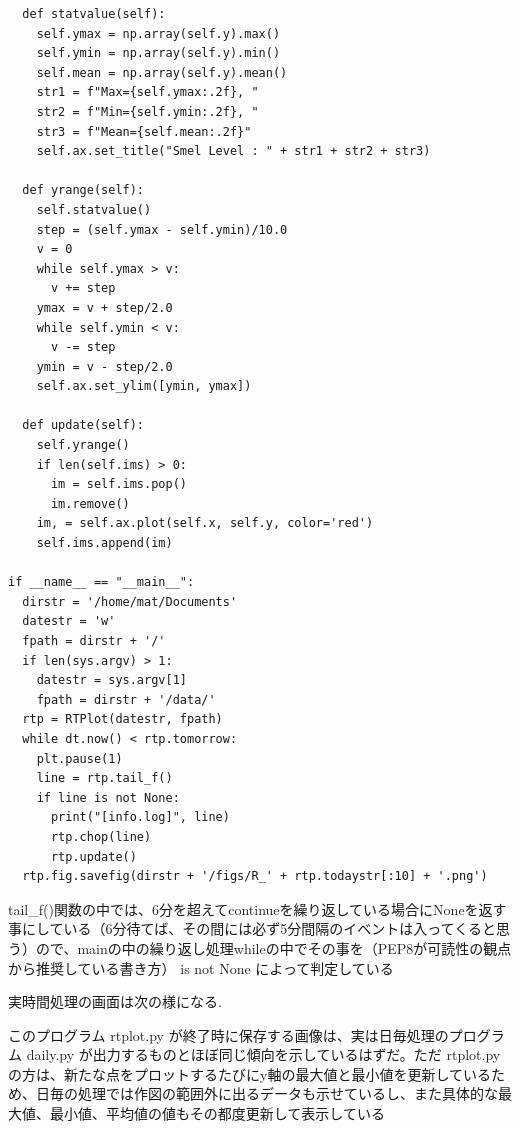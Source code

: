 \documentclass[12pt,a4j]{jsbook}
\begin{document}
\begin{spacing}{0.87}
\begin{breakbox}
\begin{verbatim}
  def statvalue(self):
    self.ymax = np.array(self.y).max()
    self.ymin = np.array(self.y).min()
    self.mean = np.array(self.y).mean()
    str1 = f"Max={self.ymax:.2f}, "
    str2 = f"Min={self.ymin:.2f}, "
    str3 = f"Mean={self.mean:.2f}"
    self.ax.set_title("Smel Level : " + str1 + str2 + str3)

  def yrange(self):
    self.statvalue()
    step = (self.ymax - self.ymin)/10.0
    v = 0
    while self.ymax > v:
      v += step
    ymax = v + step/2.0
    while self.ymin < v:
      v -= step
    ymin = v - step/2.0
    self.ax.set_ylim([ymin, ymax])

  def update(self):
    self.yrange()
    if len(self.ims) > 0:
      im = self.ims.pop()
      im.remove()
    im, = self.ax.plot(self.x, self.y, color='red')
    self.ims.append(im)

if __name__ == "__main__":
  dirstr = '/home/mat/Documents'
  datestr = 'w'
  fpath = dirstr + '/'
  if len(sys.argv) > 1:
    datestr = sys.argv[1]
    fpath = dirstr + '/data/'
  rtp = RTPlot(datestr, fpath)
  while dt.now() < rtp.tomorrow:
    plt.pause(1)
    line = rtp.tail_f()
    if line is not None:
      print("[info.log]", line)
      rtp.chop(line)
      rtp.update()
  rtp.fig.savefig(dirstr + '/figs/R_' + rtp.todaystr[:10] + '.png')
\end{verbatim}
\end{breakbox}
\end{spacing}


tail\_f()関数の中では、6分を超えてcontinueを繰り返している場合にNoneを返す事にしている（6分待てば、その間には必ず5分間隔のイベントは入ってくると思う）ので、mainの中の繰り返し処理whileの中でその事を（PEP8が可読性の観点から推奨している書き方） is not None によって判定している

実時間処理の画面は次の様になる.

このプログラム rtplot.py が終了時に保存する画像は、実は日毎処理のプログラム daily.py が出力するものとほぼ同じ傾向を示しているはずだ。ただ rtplot.py の方は、新たな点をプロットするたびにy軸の最大値と最小値を更新しているため、日毎の処理では作図の範囲外に出るデータも示せているし、また具体的な最大値、最小値、平均値の値もその都度更新して表示している
\end{document}
